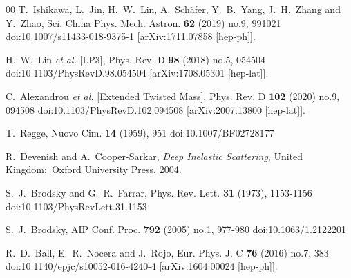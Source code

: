 \documentclass[preprint,12pt]{elsarticle}
\begin{document}
\begin{thebibliography}{00}
T.~Ishikawa, L.~Jin, H.~W.~Lin, A.~Sch\"afer, Y.~B.~Yang, J.~H.~Zhang and Y.~Zhao,
Sci. China Phys. Mech. Astron. \textbf{62} (2019) no.9, 991021
doi:10.1007/s11433-018-9375-1
[arXiv:1711.07858 [hep-ph]].

H.~W.~Lin \textit{et al.} [LP3],
Phys. Rev. D \textbf{98} (2018) no.5, 054504
doi:10.1103/PhysRevD.98.054504
[arXiv:1708.05301 [hep-lat]].

C.~Alexandrou \textit{et al.} [Extended Twisted Mass],
Phys. Rev. D \textbf{102} (2020) no.9, 094508
doi:10.1103/PhysRevD.102.094508
[arXiv:2007.13800 [hep-lat]].

T.~Regge,
Nuovo Cim. \textbf{14} (1959), 951
doi:10.1007/BF02728177

R.~Devenish and A.~Cooper-Sarkar, \emph{Deep Inelastic Scattering}, United Kingdom: Oxford University Press, 2004.

S.~J.~Brodsky and G.~R.~Farrar,
Phys. Rev. Lett. \textbf{31} (1973), 1153-1156
doi:10.1103/PhysRevLett.31.1153

S.~J.~Brodsky,
AIP Conf. Proc. \textbf{792} (2005) no.1, 977-980
doi:10.1063/1.2122201

R.~D.~Ball, E.~R.~Nocera and J.~Rojo,
Eur. Phys. J. C \textbf{76} (2016) no.7, 383
doi:10.1140/epjc/s10052-016-4240-4
[arXiv:1604.00024 [hep-ph]].


\end{thebibliography}
\end{document}
